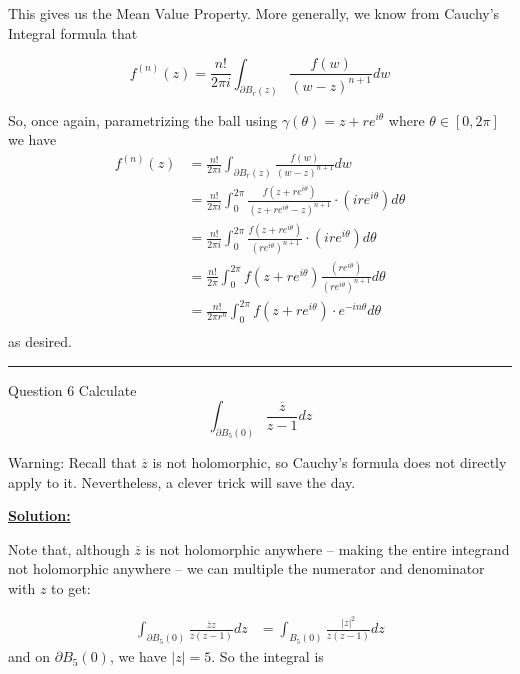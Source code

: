 \documentclass{article}
\begin{document}
This gives us the Mean Value Property. More generally, we know from Cauchy's Integral formula that 

\[ f^{(n)}(z) = \frac{n!}{2\pi i } \int_{\partial B_r(z)} \frac{f(w)}{(w-z)^{n+1}} dw \]  

So, once again, parametrizing the ball using $\gamma(\theta) = z + re^{i\theta}$ where $\theta \in [0, 2\pi]$ we have 
\begin{align*}
  f^{(n)}(z) &= \frac{n!}{2\pi i } \int_{\partial B_r(z)} \frac{f(w)}{(w-z)^{n+1}} dw \\
  &= \frac{n!}{2\pi i } \int_{0}^{2\pi} \frac{f(z + re^{i\theta})}{(z + re^{i\theta}-z)^{n+1}} \cdot  \left( i re^{i\theta} \right)d\theta \\
  &= \frac{n!}{2\pi i } \int_{0}^{2\pi} \frac{f(z + re^{i\theta})}{(re^{i\theta})^{n+1}} \cdot  \left( i re^{i\theta} \right)d\theta \\
  &= \frac{n!}{2\pi} \int_{0}^{2\pi} f(z + re^{i\theta}) \frac{\left(re^{i\theta} \right)}{(re^{i\theta})^{n+1}} d\theta \\
  &= \frac{n!}{2\pi r^n} \int_{0}^{2\pi} f(z + re^{i \theta }) \cdot e^{-i n \theta} d\theta \\
\end{align*}
as desired.
\vskip 0.5cm
\hrule 
\vskip 0.5cm





\begin{mathdefinitionbox}{Question 6}
\vskip 0.5cm
Calculate 
\[ \int_{\partial B_5(0)}\frac{\overline{z}}{z-1} dz\]

Warning: Recall that $\overline{z}$ is not holomorphic, so Cauchy's formula does not directly apply to it. Nevertheless, a clever trick will save the day.
\end{mathdefinitionbox}

\vskip 0.5cm
\underline{\textbf{Solution:}}

\vskip 0.5cm
Note that, although $\overline{z}$ is not holomorphic anywhere -- making the entire integrand not holomorphic anywhere -- we can multiple the numerator and denominator with $z$ to get:

\begin{align*}
  \int_{\partial B_5(0)} \frac{\overline{z}z}{z(z-1)}dz &= \int_{B_5(0)} \frac{\left| z \right|^2}{z(z-1)} dz 
\end{align*}
and on $\partial B_5(0)$, we have $\left| z \right| = 5$. So the integral is
\end{document}
